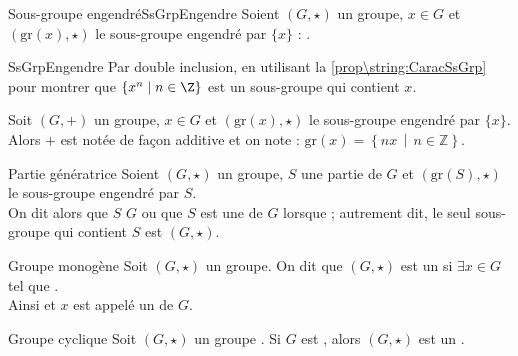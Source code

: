 \documentclass[12pt,a4paper]{report}
\begin{document}
    \begin{proposition}{Sous-groupe engendré}{SsGrpEngendre}
     Soient $(G, \star)$ un groupe, $x \in G$ et $(\text{gr}(x), \star)$ le sous-groupe engendré par $\lbrace x \rbrace$ : .
    \end{proposition}
    
    \begin{principedemo}{SsGrpEngendre}
    Par double inclusion, en utilisant la \cref{prop\string:CaracSsGrp}  pour montrer que $\{x^n \mid n \in \Z\}$ est un sous-groupe qui contient $x$.
    \end{principedemo}
    
    \begin{remarque}
    Soit $(G, +)$ un groupe, $x \in G$ et $(\text{gr}(x), \star)$ le sous-groupe engendré par $\{x\}$.\\
    Alors $+$ est notée de façon additive et on note : $\text{gr}(x) = \left\lbrace nx \,\middle|\, n \in \mathbb{Z} \right\rbrace$.
    \end{remarque}
    
    \begin{definition}{Partie génératrice}{}
    Soient $(G, \star)$ un groupe, $S$ une partie de $G$ et $(\text{gr}(S), \star)$ le sous-groupe engendré par $S$.\\
    On dit alors que $S$  $G$ ou que $S$ est une  de $G$ lorsque  ; autrement dit, le seul sous-groupe qui contient $S$ est $(G, \star)$.
    \end{definition}
    
    \begin{definition}{Groupe monogène}{}
    Soit $(G, \star)$ un groupe. On dit que $(G, \star)$ est un  si $\exists x \in G$ tel que .\\
    Ainsi  et $x$ est appelé un  de $G$.
    \end{definition}
    
    \begin{definition}{Groupe cyclique}{}
    Soit $(G, \star)$ un groupe . Si $G$ est , alors $(G, \star)$ est un .
    \end{definition}
    
\end{document}
